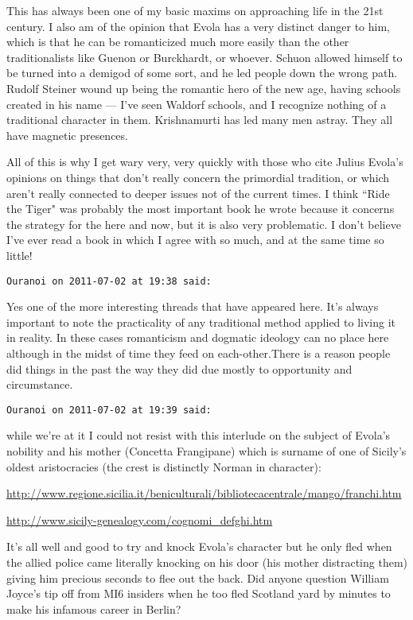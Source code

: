 \begin{footnotesize}
\begin{sffamily}
This has always been one of my basic maxims on approaching life in the 21st century. I also am of the opinion that Evola has a very distinct danger to him, which is that he can be romanticized much more easily than the other traditionalists like Guenon or Burckhardt, or whoever. Schuon allowed himself to be turned into a demigod of some sort, and he led people down the wrong path. Rudolf Steiner wound up being the romantic hero of the new age, having schools created in his name — I've seen Waldorf schools, and I recognize nothing of a traditional character in them. Krishnamurti has led many men astray. They all have magnetic presences.

All of this is why I get wary very, very quickly with those who cite Julius Evola's opinions on things that don't really concern the primordial tradition, or which aren't really connected to deeper issues not of the current times. I think ``Ride the Tiger" was probably the most important book he wrote because it concerns the strategy for the here and now, but it is also very problematic. I don't believe I've ever read a book in which I agree with so much, and at the same time so little!


\hfill

\texttt{Ouranoi on 2011-07-02 at 19:38 said: }

Yes one of the more interesting threads that have appeared here. It's always important to note the practicality of any traditional method applied to living it in reality. In these cases romanticism and dogmatic ideology can no place here although in the midst of time they feed on each-other.There is a reason people did things in the past the way they did due mostly to opportunity and circumstance.


\hfill

\texttt{Ouranoi on 2011-07-02 at 19:39 said: }

while we're at it I could not resist with this interlude on the subject of Evola's nobility and his mother (Concetta Frangipane) which is surname of one of Sicily's oldest aristocracies (the crest is distinctly Norman in character):

\url{http://www.regione.sicilia.it/beniculturali/bibliotecacentrale/mango/franchi.htm}

\url{http://www.sicily-genealogy.com/cognomi\_defghi.htm}

It's all well and good to try and knock Evola's character but he only fled when the allied police came literally knocking on his door (his mother distracting them) giving him precious seconds to flee out the back. Did anyone question William Joyce's tip off from MI6 insiders when he too fled Scotland yard by minutes to make his infamous career in Berlin?



\end{sffamily}
\end{footnotesize}
